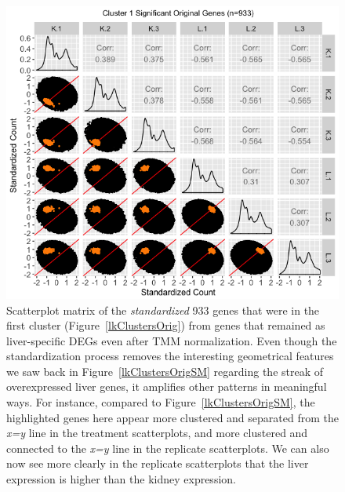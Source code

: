 \documentclass{article}
\begin{document}
  \null
  \begin{figure}[t!]
  \centerline{\includegraphics[width=1\columnwidth]{../MakeFigures/lkClustersOrigSM-St.jpg}}
  \caption{Scatterplot matrix of the \textit{standardized} 933 genes that were in the first cluster (Figure~\ref{lkClustersOrig}) from genes that remained as liver-specific DEGs even after TMM normalization. Even though the standardization process removes the interesting geometrical features we saw back in Figure~\ref{lkClustersOrigSM} regarding the streak of overexpressed liver genes, it amplifies other patterns in meaningful ways. For instance, compared to Figure~\ref{lkClustersOrigSM}, the highlighted genes here appear more clustered and separated from the \textit{x=y} line in the treatment scatterplots, and more clustered and connected to the \textit{x=y} line in the replicate scatterplots. We can also now see more clearly in the replicate scatterplots that the liver expression is higher than the kidney expression. 
  \label{lkClustersOrigSM-St}}
  \end{figure}
  
\end{document}
